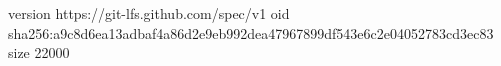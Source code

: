 version https://git-lfs.github.com/spec/v1
oid sha256:a9c8d6ea13adbaf4a86d2e9eb992dea47967899df543e6c2e04052783cd3ec83
size 22000
